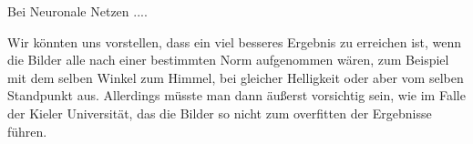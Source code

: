 \documentclass[a4,german]{article}
\begin{document}
Bei Neuronale Netzen .... %

Wir könnten uns vorstellen, dass ein viel besseres Ergebnis zu erreichen ist, wenn die Bilder alle nach einer bestimmten Norm aufgenommen wären, zum Beispiel mit dem selben Winkel zum Himmel, bei gleicher Helligkeit oder aber vom selben Standpunkt aus.
Allerdings müsste man dann äußerst vorsichtig sein, wie im Falle der Kieler Universität, das die Bilder so nicht zum overfitten der Ergebnisse führen.%



\end{document}

